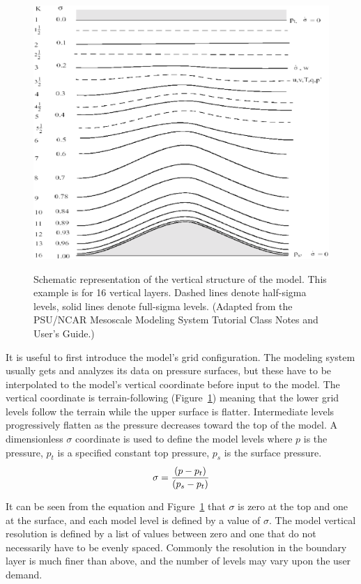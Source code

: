 \begin{figure}
\resizebox{6.45in}{!}
{\includegraphics{sigma_levels.eps}}
\caption{Schematic representation of the vertical structure of the model.
This example is for 16 vertical layers. Dashed lines denote half-sigma levels,
solid lines denote full-sigma levels. (Adapted from the PSU/NCAR Mesoscale
Modeling System Tutorial Class Notes and User's Guide.)}
\label{sigma_levels}
\end{figure}

It is useful to first introduce the model's grid configuration. The modeling
system usually gets and analyzes its data on pressure surfaces, but these have
to be interpolated to the model's vertical coordinate before input to the model.
The vertical coordinate is terrain-following (Figure~\ref{sigma_levels}) meaning
that the lower grid levels follow the terrain while the upper surface is
flatter. Intermediate levels progressively flatten as the pressure decreases
toward the top of the model. A dimensionless $\sigma$ coordinate is used to
define the model levels where $p$ is the pressure, $p_t$ is a specified constant
top pressure, $p_s$ is the surface pressure.  \begin{eqnarray} \sigma = {(p -
p_t) \over (p_s - p_t)} \end{eqnarray}

It can be seen from the equation and Figure~\ref{sigma_levels} that $\sigma$ is
zero at the top and one at the surface, and each model level is defined by a
value of $\sigma$. The model vertical resolution is defined by a list of values
between zero and one that do not necessarily have to be evenly spaced. Commonly
the resolution in the boundary layer is much finer than above, and the number of
levels may vary upon the user demand.

